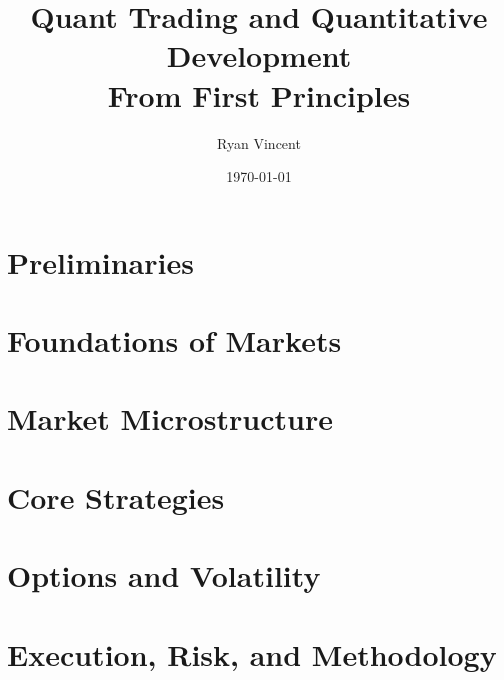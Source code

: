 \documentclass[11pt, openany, a4paper, oneside]{memoir}
\title{Quant Trading and Quantitative Development\\[0.3em]
       \Large From First Principles}
\author{Ryan Vincent}
\date{\today}
\begin{document}
\frontmatter
\maketitle

\tableofcontents
\clearpage

\mainmatter

\part{Preliminaries}


\part{Foundations of Markets}




\part{Market Microstructure}





\part{Core Strategies}







\part{Options and Volatility}





\part{Execution, Risk, and Methodology}





\end{document}
